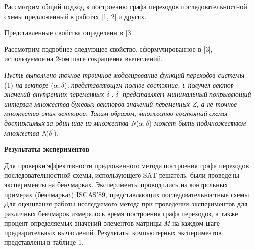 \documentclass[a4paper,11pt]{article}
\begin{document}
Рассмотрим общий подход к построению графа переходов последовательностной схемы предложенный в работах [1, 2] и других.

Представленные свойства определены в [3].

Рассмотрим подробнее следующее свойство, сформулированное в [3], используемое на 2-ом шаге сокращения вычислений.

\textit{Пусть выполнено точное троичное моделирование функций переходов системы }(1)\textit{ на векторе }($\alpha,\delta$)\textit{, представляющем полное состояние, и получен вектор значений внутренних переменных }$\delta^'$\textit{. }$\delta^'$\textit{ представляет минимальный покрывающий интервал множества булевых векторов значений переменных }\textit{Z}\textit{, а не точное множество этих векторов. Таким образом, множество состояний схемы достижимых за один шаг из множества }\textit{N}($\alpha,\delta$) \textit{может быть подмножеством множества }\textit{N}($\delta^'$)\textit{. }

\textbf{Результаты экспериментов}

Для проверки эффективности предложенного метода построения графа переходов последовательностной схемы, использующего SAT-решатель, были проведены эксперименты на бенчмарках. Эксперименты проводились на контрольных примерах (бенчмарках) ISCAS’89, представляющих последовательностные схемы. Для оценивания работы исследуемого метода при проведении экспериментов для различных бенчмарок измерялось время построения графа переходов, а также процент определяемых значений элементов матрицы \textit{M} на каждом шаге предварительных вычислений. Результаты компьютерных экспериментов представлены в таблице 1. 
\end{document}
